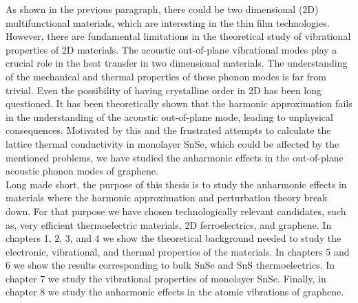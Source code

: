 As shown in the previous paragraph, there could be two dimensional (2D) multifunctional materials, which are 
interesting in the thin film technologies. However, there are fundamental limitations in the theoretical study of 
vibrational properties of 2D materials. The acoustic out-of-plane vibrational modes play a crucial 
role\cite{lindsay2010flexural} in the heat transfer in two dimensional materials. The understanding of the mechanical and thermal properties of these phonon modes is far from trivial. Even the possibility of having crystalline order 
in 2D has been long questioned\cite{landau_statistical_physics,mermin1968crystalline}. It has been theoretically 
shown that the harmonic approximation fails\cite{katsnelson2013graphene} in the understanding of the acoustic 
out-of-plane mode, leading to unphysical consequences. Motivated by this and the frustrated attempts to calculate 
the lattice thermal conductivity in monolayer SnSe, which could be affected by the mentioned problems, we have 
studied the anharmonic effects in the out-of-plane acoustic phonon modes of graphene. \\

Long made short, the purpose of this thesis is to study the anharmonic effects in materials where the harmonic 
approximation and perturbation theory break down. For that purpose we have chosen technologically relevant 
candidates, such as, very efficient thermoelectric materials, 2D ferroelectrics, and graphene. In chapters 1, 2, 3, 
and 4 we show the theoretical background needed to study the electronic, vibrational, and thermal properties of the 
materials. In chapters 5 and 6 we show the results corresponding to bulk SnSe and SnS thermoelectrics. In chapter 7 
we study the vibrational properties of monolayer SnSe. Finally, in chapter 8 we study the anharmonic effects in the 
atomic vibrations of graphene. 
